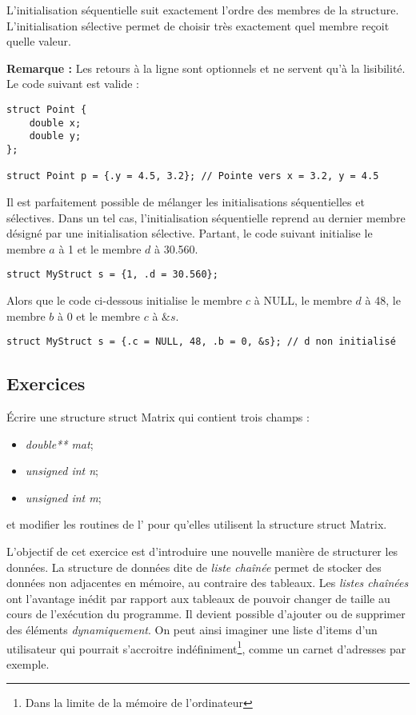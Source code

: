 \documentclass[../../../main.tex]{subfiles}
\begin{document}
L'initialisation séquentielle suit exactement l'ordre des membres de la structure.
\newline
L'initialisation sélective permet de choisir très exactement quel membre reçoit quelle valeur.
 
\textbf{Remarque :} Les retours à la ligne sont optionnels et ne servent qu'à la lisibilité. Le code suivant est valide :
\begin{verbatim}
struct Point {
	double x;
	double y;
};

struct Point p = {.y = 4.5, 3.2}; // Pointe vers x = 3.2, y = 4.5
\end{verbatim}
Il est parfaitement possible de mélanger les initialisations séquentielles et sélectives. Dans un tel cas, l’initialisation séquentielle reprend au dernier membre désigné par une initialisation sélective. Partant, le code suivant initialise le membre $a$ à 1 et le membre $d$ à 30.560.
\begin{verbatim}
struct MyStruct s = {1, .d = 30.560};
\end{verbatim}
Alors que le code ci-dessous initialise le membre $c$ à \textsf{NULL}, le membre $d$ à 48, le membre $b$ à 0 et le membre $c$ à $\&s$.
\begin{verbatim}
struct MyStruct s = {.c = NULL, 48, .b = 0, &s}; // d non initialisé
\end{verbatim}
\subsection{Exercices}
 Écrire une structure \textsf{struct Matrix} qui contient trois champs :
\begin{itemize}
	\item \textit{double** mat};
	\item \textit{unsigned int n};
	\item \textit{unsigned int m};
\end{itemize}
et modifier les routines de l' pour qu'elles utilisent la structure \textsf{struct Matrix}.

L'objectif de cet exercice est d'introduire une nouvelle manière de structurer les données. La structure de données dite de \textit{liste chaînée} permet de stocker des données non adjacentes en mémoire, au contraire des tableaux. Les \textit{listes chaînées} ont l'avantage inédit par rapport aux tableaux de pouvoir changer de taille au cours de l'exécution du programme. Il devient possible d'ajouter ou de supprimer des éléments \textit{dynamiquement}. On peut ainsi imaginer une liste d'items d'un utilisateur qui pourrait s'accroitre indéfiniment\footnote{Dans la limite de la mémoire de l'ordinateur}, comme un carnet d'adresses par exemple.
 
\end{document}
